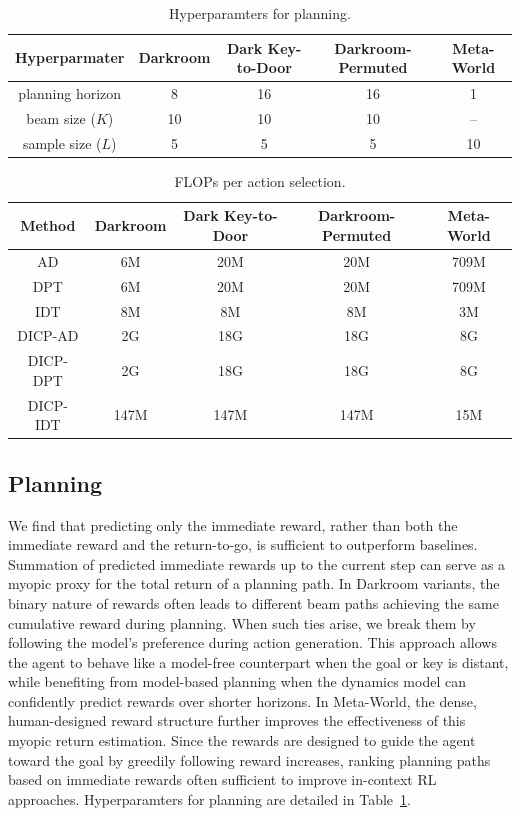 \documentclass{article}
\begin{document}
\begin{table}[t]
    \caption{Hyperparamters for planning.
    }
    \label{tab:hyp-plan}
    \small \centering
    \begin{tabular}{ccccc}
    \toprule
    Hyperparmater & Darkroom & Dark Key-to-Door & Darkroom-Permuted & Meta-World\\
    \midrule
    planning horizon & 8 & 16 & 16 & 1\\
    beam size ($K$) & 10 & 10 & 10 & --\\
    sample size ($L$) & 5 & 5 & 5 & 10\\
    \bottomrule
    \end{tabular}
\end{table}

\begin{table}[b]
    \caption{FLOPs per action selection.}
    \label{tab:flops}
    \small \centering
    \begin{tabular}{ccccc}
    \toprule
    Method & Darkroom & Dark Key-to-Door & Darkroom-Permuted & Meta-World\\
    \midrule
    AD & 6M & 20M & 20M & 709M \\
    DPT & 6M & 20M & 20M & 709M \\
    IDT & 8M & 8M & 8M & 3M \\
    \midrule
    DICP-AD & 2G & 18G & 18G & 8G \\
    DICP-DPT & 2G & 18G & 18G & 8G \\
    DICP-IDT & 147M & 147M & 147M & 15M \\
    \bottomrule
    \end{tabular}
\end{table}

\subsection{Planning}

We find that predicting only the immediate reward, rather than both the immediate reward and the return-to-go, is sufficient to outperform baselines.
Summation of predicted immediate rewards up to the current step can serve as a myopic proxy for the total return of a planning path.
In Darkroom variants, the binary nature of rewards often leads to different beam paths achieving the same cumulative reward during planning.
When such ties arise, we break them by following the model's preference during action generation.
This approach allows the agent to behave like a model-free counterpart when the goal or key is distant, while benefiting from model-based planning when the dynamics model can confidently predict rewards over shorter horizons.
In Meta-World, the dense, human-designed reward structure further improves the effectiveness of this myopic return estimation.
Since the rewards are designed to guide the agent toward the goal by greedily following reward increases, ranking planning paths based on immediate rewards often sufficient to improve in-context RL approaches.
Hyperparamters for planning are detailed in Table~\ref{tab:hyp-plan}.
\end{document}
